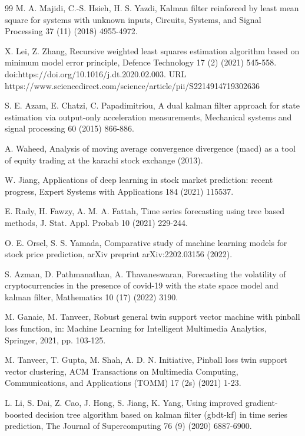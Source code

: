 \documentclass[12pt,a4paper]{article}
\begin{document}
\begin{thebibliography}{99}
		 M. A. Majidi, C.-S. Hsieh, H. S. Yazdi, Kalman filter reinforced by least mean square for systems with unknown inputs, Circuits, Systems, and Signal Processing 37 (11) (2018) 4955-4972.
		
		 X. Lei, Z. Zhang, Recursive weighted least squares estimation algorithm based on minimum model error principle, Defence Technology 17 (2) (2021) 545-558. doi:https://doi.org/10.1016/j.dt.2020.02.003. URL https://www.sciencedirect.com/science/article/pii/S2214914719302636
		
		 S. E. Azam, E. Chatzi, C. Papadimitriou, A dual kalman filter approach for state estimation via output-only acceleration measurements, Mechanical systems and signal processing 60 (2015) 866-886.
		
		 A. Waheed, Analysis of moving average convergence divergence (macd) as a tool of equity trading at the karachi stock exchange (2013).
		
		 W. Jiang, Applications of deep learning in stock market prediction: recent progress, Expert Systems with Applications 184 (2021) 115537.
		
		 E. Rady, H. Fawzy, A. M. A. Fattah, Time series forecasting using tree based methods, J. Stat. Appl. Probab 10 (2021) 229-244.
		
		 O. E. Orsel, S. S. Yamada, Comparative study of machine learning models for stock price prediction, arXiv preprint arXiv:2202.03156 (2022).
		
		 S. Azman, D. Pathmanathan, A. Thavaneswaran, Forecasting the volatility of cryptocurrencies in the presence of covid-19 with the state space model and kalman filter, Mathematics 10 (17) (2022) 3190.
		
		 M. Ganaie, M. Tanveer, Robust general twin support vector machine with pinball loss function, in: Machine Learning for Intelligent Multimedia Analytics, Springer, 2021, pp. 103-125.
		
		 M. Tanveer, T. Gupta, M. Shah, A. D. N. Initiative, Pinball loss twin support vector clustering, ACM Transactions on Multimedia Computing, Communications, and Applications (TOMM) 17 (2s) (2021) 1-23.
		
		 L. Li, S. Dai, Z. Cao, J. Hong, S. Jiang, K. Yang, Using improved gradient-boosted decision tree algorithm based on kalman filter (gbdt-kf) in time series prediction, The Journal of Supercomputing 76 (9) (2020) 6887-6900.
		

\end{thebibliography}
\end{document}
